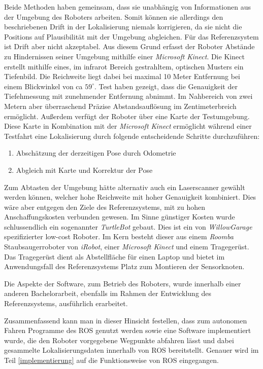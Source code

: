 Beide Methoden haben gemeinsam, dass sie unabhängig von Informationen aus der
Umgebung des Roboters arbeiten. Somit können sie allerdings den beschriebenen
Drift in der Lokalisierung niemals korrigieren, da sie nicht die Positions auf
Plausibilität mit der Umgebung abgleichen.  Für das Referenzsystem ist Drift
aber nicht akzeptabel. Aus diesem Grund erfasst der Roboter Abstände zu
Hindernissen seiner Umgebung mithilfe einer \textit{Microsoft Kinect}. Die
Kinect erstellt mithilfe eines, im infrarot Bereich gestrahltem, optischen
Musters ein Tiefenbild.  Die Reichweite liegt dabei bei maximal 10 Meter
Entfernung bei einem Blickwinkel von ca $59^{\circ}$.
Test haben gezeigt, dass die Genauigkeit der Tiefehmessung mit zunehmender
Entfernung abnimmt. Im Nahbereich von zwei Metern aber überraschend Präzise
Abstandsauflösung im Zentimeterbreich ermöglicht.  Außerdem verfügt der Roboter
über eine Karte der Testumgebung. Diese Karte in Kombination mit der
\textit{Microsoft Kinect} ermöglicht während einer Testfahrt eine Lokalisierung
durch folgende entscheidende Schritte durchzuführen:

\begin{enumerate}
  \item Abschätzung der derzeitigen Pose durch Odometrie
  \item Abgleich mit Karte und Korrektur der Pose
\end{enumerate}

Zum Abtasten der Umgebung hätte alternativ auch ein Laserscanner gewählt werden
können, welcher hohe Reichweite mit hoher Genauigkeit kombiniert. Dies wäre
aber entgegen den Ziele des Referenzsystems, mit zu hohen Anschaffungskosten
verbunden gewesen. Im Sinne günstiger Kosten wurde schlussendlich ein
sogenannter \textit{TurtleBot} gebaut. Dies ist ein von \textit{WillowGarage}
spezifizierter low-cost Roboter.
Im Kern besteht dieser aus einem \textit{Roomba} Staubsaugerroboter von \textit{iRobot}, 
einer \textit{Microsoft Kinect} und einem Tragegerüst. Das Tragegerüst dient als
Abstellfläche für einen Laptop und bietet im Anwendungsfall des Referenzsystems
Platz zum Montieren der Sensorknoten.


Die Aspekte der Software, zum Betrieb des Roboters, wurde innerhalb einer anderen
Bachelorarbeit, ebenfalls im Rahmen der Entwicklung des Referenzsystems, ausführlich 
erarbeitet.

Zusammenfassend kann man in dieser Hinsicht festellen, dass zum autonomen Fahren
Programme des \gls{ROS} genutzt werden sowie eine Software implementiert wurde,
die den Roboter vorgegebene Wegpunkte abfahren lässt und dabei gesammelte
Lokalisierungsdaten innerhalb von \gls{ROS} bereitstellt. Genauer wird im Teil
\ref{implementierung} auf die Funktionsweise von \gls{ROS} eingegangen.


